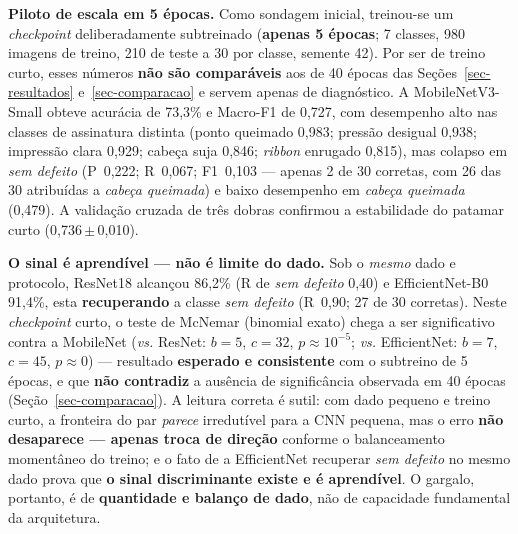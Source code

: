 \documentclass[
	article,			%
	11pt,				%
	oneside,			%
	a4paper,			%
	english,			%
	brazilian,			%
	sumario=tradicional
	]{abntex2}
\begin{document}
\noindent\textbf{Piloto de escala em 5 épocas.} Como sondagem inicial, treinou-se um
\textit{checkpoint} deliberadamente subtreinado (\textbf{apenas 5 épocas}; 7 classes,
980 imagens de treino, 210 de teste a 30 por classe, semente 42). Por ser de treino
curto, esses números \textbf{não são comparáveis} aos de 40 épocas das
Seções~\ref{sec-resultados} e~\ref{sec-comparacao} e servem apenas de diagnóstico. A
MobileNetV3-Small obteve acurácia de 73,3\% e Macro-F1 de 0,727, com desempenho alto
nas classes de assinatura distinta (ponto queimado 0,983; pressão desigual 0,938;
impressão clara 0,929; cabeça suja 0,846; \textit{ribbon} enrugado 0,815), mas colapso
em \emph{sem defeito} (P~0,222; R~0,067; F1~0,103 --- apenas 2 de 30 corretas, com 26
das 30 atribuídas a \emph{cabeça queimada}) e baixo desempenho em \emph{cabeça
queimada} (0,479). A validação cruzada de três dobras confirmou a estabilidade do
patamar curto (0,736\,$\pm$\,0,010).

\noindent\textbf{O sinal é aprendível --- não é limite do dado.} Sob o
\emph{mesmo} dado e protocolo, ResNet18 alcançou 86,2\% (R de \emph{sem defeito} 0,40)
e EfficientNet-B0 91,4\%, esta \textbf{recuperando} a classe \emph{sem defeito}
(R~0,90; 27 de 30 corretas). Neste \textit{checkpoint} curto, o teste de McNemar
(binomial exato) \cite{dietterich1998tests} chega a ser significativo contra a
MobileNet (\textit{vs.} ResNet: $b{=}5$, $c{=}32$, $p\approx10^{-5}$; \textit{vs.}
EfficientNet: $b{=}7$, $c{=}45$, $p\approx0$) --- resultado \textbf{esperado e
consistente} com o subtreino de 5 épocas, e que \textbf{não contradiz} a ausência de
significância observada em 40 épocas (Seção~\ref{sec-comparacao}). A leitura correta é
sutil: com dado pequeno e treino curto, a fronteira do par \emph{parece} irredutível
para a CNN pequena, mas o erro \textbf{não desaparece --- apenas troca de direção}
conforme o balanceamento momentâneo do treino; e o fato de a EfficientNet recuperar
\emph{sem defeito} no mesmo dado prova que \textbf{o sinal discriminante existe e é
aprendível}. O gargalo, portanto, é de \textbf{quantidade e balanço de dado}, não de
capacidade fundamental da arquitetura.
\end{document}
